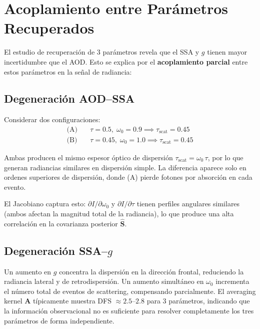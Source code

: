 \documentclass[a4paper,11pt]{article}
\begin{document}
\section{Acoplamiento entre Par\'ametros Recuperados}
\label{sec:interp_coupling}

El estudio de recuperaci\'on de 3 par\'ametros revela que el SSA y $g$ tienen
mayor incertidumbre que el AOD.  Esto se explica por el \textbf{acoplamiento
parcial} entre estos par\'ametros en la se\~nal de radiancia:

\subsection{Degeneraci\'on AOD--SSA}

Considerar dos configuraciones:
\begin{align}
    \text{(A)} &\quad \tau = 0.5,\; \omega_0 = 0.9 \implies \tau_{\text{scat}} = 0.45 \\
    \text{(B)} &\quad \tau = 0.45,\; \omega_0 = 1.0 \implies \tau_{\text{scat}} = 0.45
\end{align}

Ambas producen el mismo espesor \'optico de dispersi\'on $\tau_{\text{scat}} =
\omega_0\,\tau$, por lo que generan radiancias similares en dispersi\'on simple.
La diferencia aparece solo en ordenes superiores de dispersi\'on, donde (A) pierde
fotones por absorci\'on en cada evento.

El Jacobiano captura esto: $\partial I / \partial\omega_0$ y
$\partial I / \partial\tau$ tienen perfiles angulares similares (ambos afectan
la magnitud total de la radiancia), lo que produce una alta correlaci\'on
en la covarianza posterior $\hat{\mathbf{S}}$.

\subsection{Degeneraci\'on SSA--$g$}

Un aumento en $g$ concentra la dispersi\'on en la direcci\'on frontal, reduciendo
la radiancia lateral y de retrodispersi\'on.  Un aumento simult\'aneo en $\omega_0$
incrementa el n\'umero total de eventos de scattering, compensando parcialmente.
El averaging kernel $\mathbf{A}$ t\'ipicamente muestra DFS $\approx 2.5$--$2.8$
para 3 par\'ametros, indicando que la informaci\'on observacional no es suficiente
para resolver completamente los tres par\'ametros de forma independiente.
\end{document}
